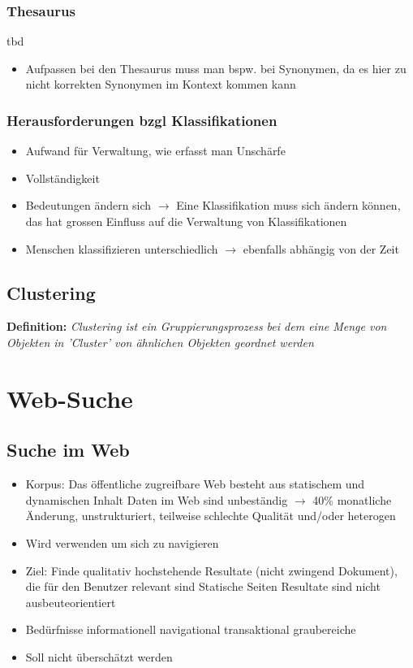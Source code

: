 \documentclass{report}
\theoremstyle{definition}
\theoremstyle{example}
\begin{document}
\subsection{Thesaurus}
tbd

\begin{itemize}
   \item Aufpassen bei den Thesaurus muss man bspw. bei Synonymen, da es hier zu nicht korrekten Synonymen im Kontext kommen kann
\end{itemize}

\subsection{Herausforderungen bzgl Klassifikationen}
\begin{itemize}
   \item Aufwand für Verwaltung, wie erfasst man Unschärfe
   \item Vollständigkeit
   \item Bedeutungen ändern sich $\rightarrow$ Eine Klassifikation muss sich ändern können, das hat grossen Einfluss auf die Verwaltung von Klassifikationen
   \item Menschen klassifizieren unterschiedlich $\rightarrow$ ebenfalls abhängig von der Zeit
\end{itemize}

\section{Clustering}
\textbf{Definition:} \textit{Clustering ist ein Gruppierungsprozess bei dem eine Menge von Objekten in 'Cluster' von ähnlichen Objekten geordnet werden}



\chapter{Web-Suche}

\section{Suche im Web}
\begin{itemize}
   \item Korpus: Das öffentliche zugreifbare Web besteht aus statischem und dynamischen Inhalt
   \subitem Daten im Web sind unbeständig $\rightarrow$ 40\% monatliche Änderung, unstrukturiert, teilweise schlechte Qualität und/oder heterogen
   \item Wird verwenden um sich zu navigieren
   \item Ziel: Finde qualitativ hochstehende Resultate (nicht zwingend Dokument), die für den Benutzer relevant sind
   \subitem Statische Seiten
   \subitem Resultate sind nicht ausbeuteorientiert
   \item Bedürfnisse
   \subitem informationell
   \subitem navigational
   \subitem transaktional
   \subitem graubereiche
   \item Soll nicht überschätzt werden
\end{itemize}
\end{document}
